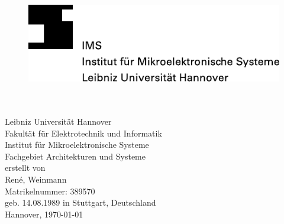 \begin{titlepage}
	\begin{figure}[ht]
			\includegraphics{pics/IMS_LUH.pdf}
	\end{figure}
	
\vspace{2.5cm}

\begin{center}
	\Huge\normalfont{}\\
	\vspace{40pt}
  \LARGE\normalfont{}\\
	\vspace{60pt}
  \Large{	Leibniz Universität Hannover\\
					Fakultät für Elektrotechnik und Informatik\\
					Institut für Mikroelektronische Systeme\\
					Fachgebiet Architekturen und Systeme}\\
	\vspace{70pt}
  \large{erstellt von}\\
  \vspace{30pt}
	\Large{Ren\'{e}, Weinmann\\
         Matrikelnummer: 389570}\\
  \Large{geb. 14.08.1989 \hspace{10pt}in Stuttgart, Deutschland}\\
	\vspace{20pt}
	\large{Hannover, \today}
	  
  \end{center}

\end{titlepage}

